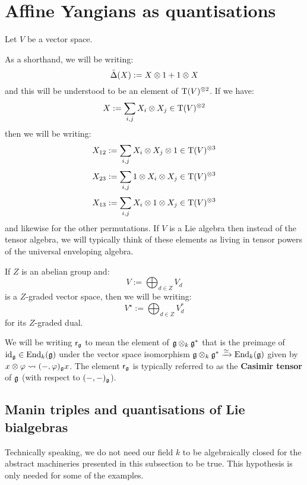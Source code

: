 \section{Affine Yangians as quantisations}
    \begin{convention}
        Let $V$ be a vector space.
    
        As a shorthand, we will be writing:
            $$\bar{\Delta}(X) := X \tensor 1 + 1 \tensor X$$
        and this will be understood to be an element of $\rmT(V)^{\tensor 2}$. If we have:
            $$X := \sum_{i, j} X_i \tensor X_j \in \rmT(V)^{\tensor 2}$$
        then we will be writing:
            $$X_{12} := \sum_{i, j} X_i \tensor X_j \tensor 1 \in \rmT(V)^{\tensor 3}$$
            $$X_{23} := \sum_{i, j} 1 \tensor X_i \tensor X_j \in \rmT(V)^{\tensor 3}$$
            $$X_{13} := \sum_{i, j} X_i \tensor 1 \tensor X_j \in \rmT(V)^{\tensor 3}$$
        and likewise for the other permutations. If $V$ is a Lie algebra then instead of the tensor algebra, we will typically think of these elements as living in tensor powers of the universal enveloping algebra.
    \end{convention}

    \begin{convention}
        If $Z$ is an abelian group and:
            $$V := \bigoplus_{d \in Z} V_d$$
        is a $Z$-graded vector space, then we will be writing:
            $$V^{\star} := \bigoplus_{d \in Z} V_d^*$$
        for its $Z$-graded dual.
    \end{convention}

    \begin{convention} \label{conv: casimir_tensor}
        We will be writing $\mathsf{r}_{\mathfrak{g}}$ to mean the element of $\g \tensor_k \g^*$ that is the preimage of $\mathrm{id}_{\mathfrak{g}} \in \mathrm{End}_k(\mathfrak{g})$ under the vector space isomorphism $\g \tensor_k \g^* \xrightarrow[]{\cong} \End_k(\g)$ given by $x \tensor \varphi \mapsto (-, \varphi)_{\g} x$. The element $\mathsf{r}_{\mathfrak{g}}$ is typically referred to as the \textbf{Casimir tensor} of $\mathfrak{g}$ (with respect to $(-, -)_{\mathfrak{g}}$). 
    \end{convention}

    \subsection{Manin triples and quantisations of Lie bialgebras} \label{subsection: manin_triples_and_quantisations_of_lie_bialgebras}
        \begin{remark}
            Technically speaking, we do not need our field $k$ to be algebraically closed for the abstract machineries presented in this subsection to be true. This hypothesis is only needed for some of the examples. 
        \end{remark}
    
